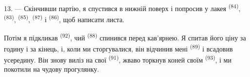 13. --- Скінчивши партію, я спустився в нижній поверх і попросив у лакея
 \textsuperscript{(84)},  \textsuperscript{(83)},
 \textsuperscript{(85)},  \textsuperscript{(87)} і
 \textsuperscript{(86)}, щоб написати листа.

Потім я підкликав  \textsuperscript{(92)}, чий 
\textsuperscript{(88)} спинився перед кав'ярнею. Я спитав його ціну за годину і
за кінець, і, коли ми сторгувалися, він відчинив мені 
\textsuperscript{(89)} і всадовив усередину. Він знову виліз на свої
 \textsuperscript{(91)}, жваво торкнув коней своїм 
\textsuperscript{(93)}, і ми покотили на чудову прогулянку.
\VUsaut{6.0mm}
\VUfilet{22mm}
